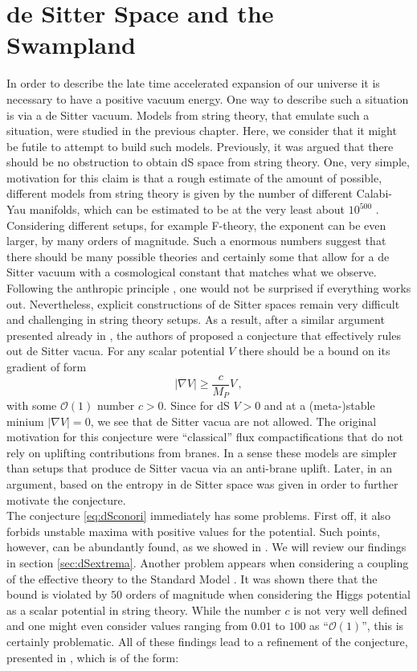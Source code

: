 \documentclass[a4paper,12pt]{report}
\newcommand{\be}{\begin{equation}}
\newcommand{\ee}{\end{equation}}
\begin{document}
\section{de Sitter Space and the Swampland}
In order to describe the late time accelerated expansion of our universe it is necessary to have a positive vacuum energy. One way to describe such a situation is via a de Sitter vacuum. Models from string theory, that emulate such a situation, were studied in the previous chapter. Here, we consider that it might be futile to attempt to build such models. Previously, it was argued that there should be no obstruction to obtain dS space from string theory. One, very simple, motivation for this claim is that a rough estimate of the amount of possible, different models from string theory is given by the number of different Calabi-Yau manifolds, which can be estimated to be at the very least about $10^{500}$ \cite{Blumenhagen:2004xx}. Considering different setups, for example F-theory, the exponent can be even larger, by many orders of magnitude. Such a enormous numbers suggest that there should be many possible theories and certainly some that allow for a de Sitter vacuum with a cosmological constant that matches what we observe. Following the anthropic principle \cite{Weinberg:1987dv}, one would not be surprised if everything works out. Nevertheless, explicit constructions of de Sitter spaces remain very difficult and challenging in string theory setups. As a result, after a similar argument presented already in \cite{Danielsson:2018ztv}, the authors of \cite{Obied:2018sgi} proposed a conjecture that effectively rules out de Sitter vacua. For any scalar potential $V$ there should be a bound on its gradient of form
\be 
|\nabla V| \geq \frac{c}{M_P} V\,,
\label{eq:dSconori}
\ee
with some $\mathcal{O}(1)$ number $c>0$. Since for dS $V>0$ and at a (meta-)stable minium $|\nabla V| = 0$, we see that de Sitter vacua are not allowed. The original motivation for this conjecture were ``classical'' flux compactifications that do not rely on uplifting contributions from branes. In a sense these models are simpler than setups that produce de Sitter vacua via an anti-brane uplift. Later, in \cite{Ooguri:2018wrx} an argument, based on the entropy in de Sitter space was given in order to further motivate the conjecture.\\
The conjecture \eqref{eq:dSconori} immediately has some problems. First off, it also forbids unstable maxima with positive values for the potential. Such points, however, can be abundantly found, as we showed in \cite{Roupec:2018mbn}. We will review our findings in section \ref{sec:dSextrema}. Another problem appears when considering a coupling of the effective theory to the Standard Model \cite{Denef:2018etk}. It was shown there that the bound is violated by $50$ orders of magnitude when considering the Higgs potential as a scalar potential in string theory. While the number $c$ is not very well defined and one might even consider values ranging from $0.01$ to $100$ as ``$\mathcal{O}(1)$'', this is certainly problematic. All of these findings lead to a refinement of the conjecture, presented in \cite{Ooguri:2018wrx}, which is of the form:
\end{document}
